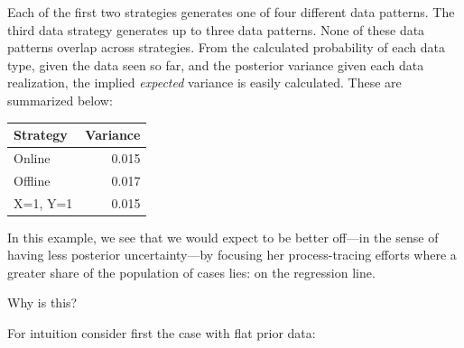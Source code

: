 \documentclass[
  12pt,
]{book}
\begin{document}
Each of the first two strategies generates one of four different data patterns. The third data strategy generates up to three data patterns. None of these data patterns overlap across strategies.
From the calculated probability of each data type, given the data seen so far, and the posterior variance given each data realization, the implied \emph{expected} variance is easily calculated. These are summarized below:

\begin{tabular}{l|r}
\hline
Strategy & Variance\\
\hline
Online & 0.015\\
\hline
Offline & 0.017\\
\hline
X=1, Y=1 & 0.015\\
\hline
\end{tabular}

In this example, we see that we would expect to be better off---in the sense of having less posterior uncertainty---by focusing her process-tracing efforts where a greater share of the population of cases lies: on the regression line.

Why is this?

For intuition consider first the case with flat prior data:
\end{document}
